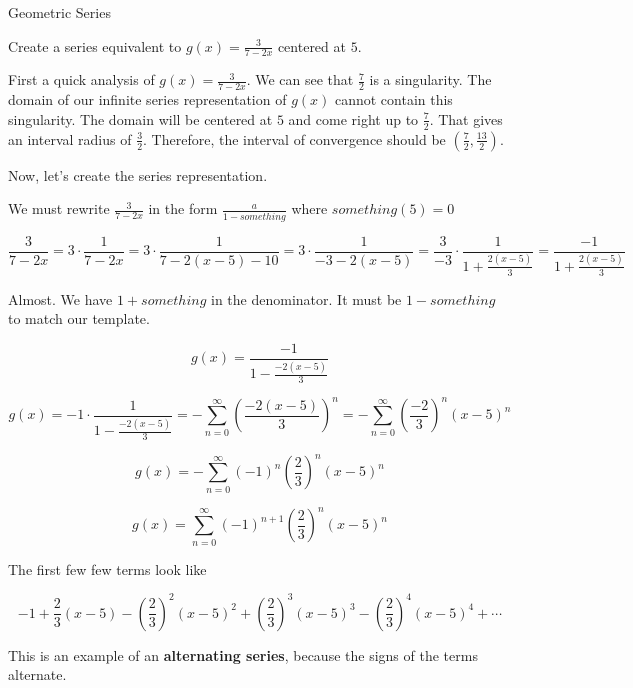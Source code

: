 \documentclass{ximera}
\begin{document}
\begin{example} Geometric Series



Create a series equivalent to $g(x)=\frac{3}{7 - 2x}$ centered at $5$.



\begin{explanation}


First a quick analysis of $g(x)=\frac{3}{7 - 2x}$.  We can see that $\frac{7}{2}$ is a singularity. The domain of our infinite series representation of $g(x)$ cannot contain this singularity.  The domain will be centered at $5$ and come right up to $\frac{7}{2}$.  That gives an interval radius of $\frac{3}{2}$. Therefore, the interval of convergence should be $\left( \frac{7}{2}, \frac{13}{2} \right)$.

Now, let's create the series representation.

We must rewrite $\frac{3}{7 - 2x}$ in the form $\frac{a}{1-something}$ where $something(5) = 0$



\[      \frac{3}{7 - 2x}  = 3   \cdot \frac{1}{7 - 2x} =    3   \cdot \frac{1}{7 - 2(x-5) - 10} =   3   \cdot \frac{1}{-3 - 2(x-5)}   =   \frac{3}{-3}   \cdot \frac{1}{1 + \frac{2(x-5)}{3}}  = \frac{-1}{1 + \frac{2(x-5)}{3}}  \]



Almost.  We have $1 + something$ in the denominator. It must be $1 - something$ to match our template.


\[    g(x) =   \frac{-1}{1 - \frac{-2(x-5)}{3}}       \]

\[  g(x) =    -1 \cdot \frac{1}{1 - \frac{-2(x-5)}{3}}     =   -   \sum_{n=0}^{\infty}   \left( \frac{-2(x-5)}{3} \right)^n     =   -  \sum_{n=0}^{\infty}   \left( \frac{-2}{3} \right)^n  (x-5)^n\]


\[  g(x)     =   -  \sum_{n=0}^{\infty}   (-1)^n \left( \frac{2}{3} \right)^n  (x-5)^n    \]

\[  g(x)     =    \sum_{n=0}^{\infty}   (-1)^{n+1} \left( \frac{2}{3} \right)^n  (x-5)^n    \]

The first few few terms look like


\[   -1 + \frac{2}{3} (x-5) - \left( \frac{2}{3} \right)^2 (x-5)^2 +  \left( \frac{2}{3} \right)^3 (x-5)^3 - \left( \frac{2}{3} \right)^4 (x-5)^4    + \cdots   \]


This is an example of an \textbf{alternating series}, because the signs of the terms alternate. \\


\end{explanation}
\end{example}
\end{document}
